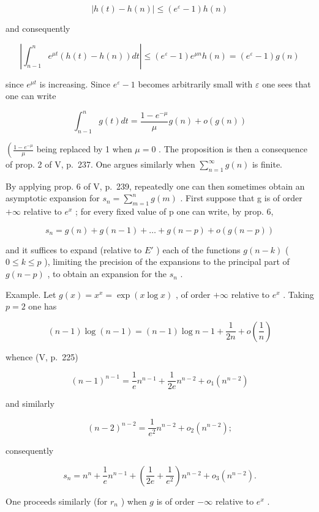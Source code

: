 \[
| h (t) - h (n) | \leqslant \left(e ^ {\varepsilon} - 1\right) h (n)
\]

and consequently

\[
\left| \int_ {n - 1} ^ {n} e ^ {\mu t} (h (t) - h (n)) d t \right| \leqslant (e ^ {\varepsilon} - 1) e ^ {\mu n} h (n) = (e ^ {\varepsilon} - 1) g (n)
\]

since \(e^{\mu t}\) is increasing. Since \(e^{\varepsilon} - 1\) becomes arbitrarily small with \(\varepsilon\) one sees that one can write

\[
\int_ {n - 1} ^ {n} g (t) d t = \frac {1 - e ^ {- \mu}}{\mu} g (n) + o (g (n))
\]

\(\left(\frac{1 - e^{-\mu}}{\mu}\right.\) being replaced by 1 when \(\mu = 0\) . The proposition is then a consequence of prop. 2 of V, p.~237. One argues similarly when \(\sum_{n=1}^{\infty} g(n)\) is finite.

By applying prop. 6 of V, p.~239, repeatedly one can then sometimes obtain an asymptotic expansion for \(s_{n} = \sum_{m=1}^{n} g(m)\) . First suppose that g is of order \(+\infty\) relative to \(e^{x}\) ; for every fixed value of p one can write, by prop. 6,

\[
s _ {n} = g (n) + g (n - 1) + \dots + g (n - p) + o (g (n - p))
\]

and it suffices to expand (relative to \(E'\) ) each of the functions \(g(n-k)\) ( \(0 \leqslant k \leqslant p\) ), limiting the precision of the expansions to the principal part of \(g(n-p)\) , to obtain an expansion for the \(s_{n}\) .

Example. Let \(g(x) = x^{x} = \exp (x\log x)\) , of order \(+\infty\) relative to \(e^x\) . Taking \(p = 2\) one has

\[
(n - 1) \log (n - 1) = (n - 1) \log n - 1 + \frac {1}{2 n} + o \left(\frac {1}{n}\right)
\]

whence (V, p.~225)

\[
(n - 1) ^ {n - 1} = \frac {1}{e} n ^ {n - 1} + \frac {1}{2 e} n ^ {n - 2} + o _ {1} (n ^ {n - 2})
\]

and similarly

\[
(n - 2) ^ {n - 2} = \frac {1}{e ^ {2}} n ^ {n - 2} + o _ {2} (n ^ {n - 2});
\]

consequently

\[
s _ {n} = n ^ {n} + \frac {1}{e} n ^ {n - 1} + \left(\frac {1}{2 e} + \frac {1}{e ^ {2}}\right) n ^ {n - 2} + o _ {3} (n ^ {n - 2}).
\]

One proceeds similarly (for \(r_n\) ) when \(g\) is of order \(-\infty\) relative to \(e^x\) .

